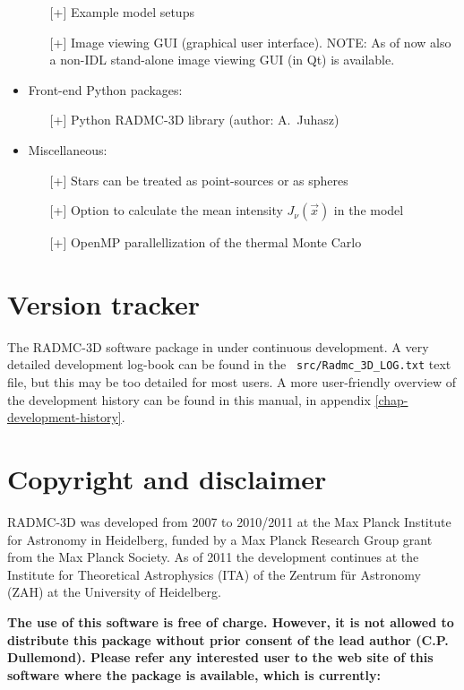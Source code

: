 \documentclass{report}
\begin{document}
\begin{itemize}
  \begin{itemize}
    \item[][+] Example model setups
    \item[][+] Image viewing GUI (graphical user interface). NOTE: As of now
      also a non-IDL stand-alone image viewing GUI (in Qt) is available.
  \end{itemize}
\item Front-end Python packages:
  \begin{itemize}
    \item[][+] Python RADMC-3D library (author: A.~Juhasz)
  \end{itemize}
\item Miscellaneous:
  \begin{itemize}
    \item[][+] Stars can be treated as point-sources or as spheres
    \item[][+] Option to calculate the mean intensity $J_\nu(\vec x)$ in the model
    \item[][+] OpenMP parallellization of the thermal Monte Carlo
  \end{itemize}
\end{itemize}


\section{Version tracker}
The RADMC-3D software package in under continuous development. A very
detailed development log-book can be found in the {\small\tt
  src/Radmc\_3D\_LOG.txt} text file, but this may be too detailed for most
users. A more user-friendly overview of the development history can be 
found in this manual, in appendix \ref{chap-development-history}.


\section{Copyright and disclaimer} 
RADMC-3D was developed from 2007 to 2010/2011 at the Max Planck Institute
for Astronomy in Heidelberg, funded by a Max Planck Research Group grant
from the Max Planck Society. As of 2011 the development continues at the
Institute for Theoretical Astrophysics (ITA) of the Zentrum f\"ur Astronomy
(ZAH) at the University of Heidelberg.

{\bf The use of this software is free of charge. However, it is not allowed
  to distribute this package without prior consent of the lead author
  (C.P. Dullemond). Please refer any interested user to the web site of this
  software where the package is available, which is currently:}
\end{document}
